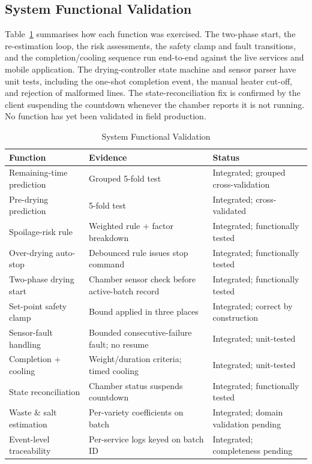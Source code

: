 \documentclass[conference]{IEEEtran}
\begin{document}
\subsection{System Functional Validation}
Table~\ref{tab2} summarises how each function was exercised. The two-phase
start, the re-estimation loop, the risk assessments, the safety clamp and
fault transitions, and the completion/cooling sequence run end-to-end
against the live services and mobile application. The drying-controller
state machine and sensor parser have unit tests, including the one-shot
completion event, the manual heater cut-off, and rejection of malformed
lines. The state-reconciliation fix is confirmed by the client suspending
the countdown whenever the chamber reports it is not running. No function
has yet been validated in field production.

\begin{table}[t]
\caption{System Functional Validation}
\begin{center}
\renewcommand{\arraystretch}{1.12}
\footnotesize
\begin{tabular}{@{}p{2.7cm}p{2.5cm}p{2.2cm}@{}}
\toprule
\textbf{Function} & \textbf{Evidence} & \textbf{Status} \\
\midrule
Remaining-time prediction & Grouped 5-fold test & Integrated;
grouped cross-validation \\
Pre-drying prediction & 5-fold test & Integrated; cross-validated \\
Spoilage-risk rule & Weighted rule + factor breakdown & Integrated;
functionally tested \\
Over-drying auto-stop & Debounced rule issues stop command & Integrated;
functionally tested \\
Two-phase drying start & Chamber sensor check before active-batch record
& Integrated; functionally tested \\
Set-point safety clamp & Bound applied in three places & Integrated;
correct by construction \\
Sensor-fault handling & Bounded consecutive-failure fault; no resume &
Integrated; unit-tested \\
Completion + cooling & Weight/duration criteria; timed cooling &
Integrated; unit-tested \\
State reconciliation & Chamber status suspends countdown & Integrated;
functionally tested \\
Waste \& salt estimation & Per-variety coefficients on batch &
Integrated; domain validation pending \\
Event-level traceability & Per-service logs keyed on batch ID &
Integrated; completeness pending \\
\bottomrule
\end{tabular}
\label{tab2}
\end{center}
\end{table}
\end{document}
